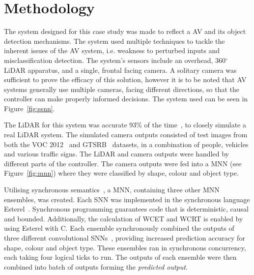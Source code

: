 \section{Methodology} 
The system designed for this case study was made to reflect a \acf{AV} and its object detection mechanisms. 
The system used multiple techniques to tackle the inherent issues of the \ac{AV} system, i.e. weakness to perturbed inputs and misclassification detection.
The system's sensors include an overhead, 360$^\circ$ \acf{LiDAR} apparatus, and a single, frontal facing camera.
A solitary camera was sufficient to prove the efficacy of this solution, however it is to be noted that \ac{AV} systems generally use multiple cameras, facing different directions, so that the controller can make properly informed decisions.
The system used can be seen in Figure~\ref{fig:ssnn}. 

The \ac{LiDAR} for this system was accurate 93\% of the time~\cite{lidarFusion}, to closely simulate a real \ac{LiDAR} system.
The simulated camera outputs consisted of test images from both the \ac{VOC} 2012~\cite{pascal-voc-2012} and \ac{GTSRB}~\cite{Stallkamp2012-gtsrb} datasets, in a combination of people, vehicles and various traffic signs.
The \ac{LiDAR} and camera outputs were handled by different parts of the controller.
The camera outputs were fed into a \ac{MNN} (see Figure~\ref{fig:mnn}) where they were classified by shape, colour and object type.

Utilising synchronous semantics~\cite{benveniste2003synchronous}, a \acf{MNN}, containing three other \ac{MNN} ensembles, was created.
Each \acf{SNN} was implemented in the synchronous language Esterel~\cite{Esterel}.
Synchronous programming guarantees code that is deterministic, causal and bounded.
Additionally, the calculation of \acf{WCET} and \acf{WCRT} is enabled by using Esterel with C.
Each ensemble synchronously combined the outputs of three different convolutional \acp{SNN}~\cite{sann}, providing increased prediction accuracy for shape, colour and object type. 
These ensembles ran in synchronous concurrency, each taking four logical ticks to run. 
The outputs of each ensemble were then combined into batch of outputs forming the \textit{predicted output}. 

